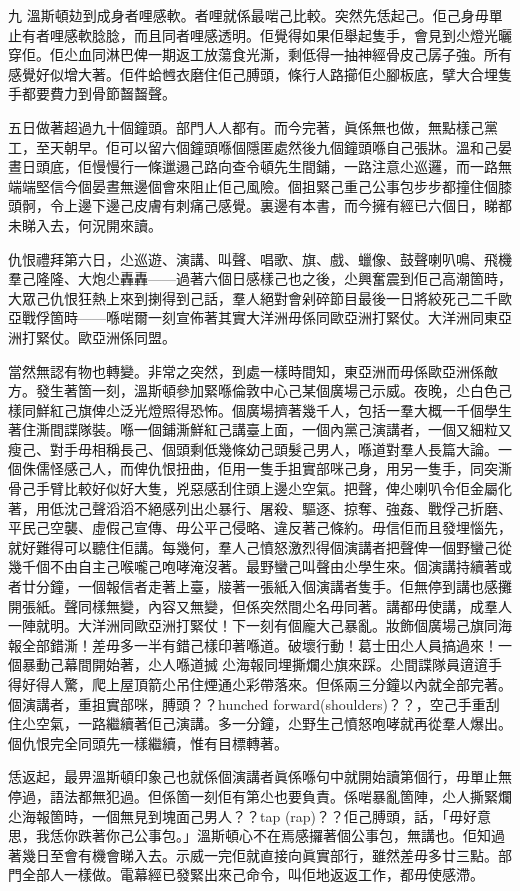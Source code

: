 九
溫斯頓攰到成身者哩感軟。者哩就係最啱己比較。突然先恁起己。佢己身毋單止有者哩感軟腍腍，而且同者哩感透明。佢覺得如果佢舉起隻手，會見到尐燈光曬穿佢。佢尐血同淋巴俾一期返工放蕩食光澌，剩低得一抽神經骨皮己孱子強。所有感覺好似增大著。佢件蛤乸衣磨住佢己膊頭，條行人路擳佢尐腳板底，擘大合埋隻手都要費力到骨節齧齧聲。

五日做著超過九十個鐘頭。部門人人都有。而今完著，眞係無也做，無點樣己黨工，至天朝早。佢可以留六個鐘頭喺個隱匿處然後九個鐘頭喺自己張牀。溫和己晏晝日頭底，佢慢慢行一條邋遢己路向查令頓先生間鋪，一路注意尐巡邏，而一路無端端堅信今個晏晝無邊個會來阻止佢己風險。個抯緊己重己公事包步步都撞住個膝頭䯊，令上邊下邊己皮膚有刺痛己感覺。裏邊有本書，而今擁有經已六個日，睇都未睇入去，何況開來讀。

仇恨禮拜第六日，尐巡遊、演講、叫聲、唱歌、旗、戲、蠟像、鼓聲喇叭鳴、飛機羣己隆隆、大炮尐轟轟——過著六個日感樣己也之後，尐興奮震到佢己高潮箇時，大眾己仇恨狂熱上來到揦得到己話，羣人絕對會剁碎節目最後一日將絞死己二千歐亞戰俘箇時——喺啱爾一刻宣佈著其實大洋洲毋係同歐亞洲打緊仗。大洋洲同東亞洲打緊仗。歐亞洲係同盟。

當然無認有物也轉變。非常之突然，到處一樣時間知，東亞洲而毋係歐亞洲係敵方。發生著箇一刻，溫斯頓參加緊喺倫敦中心己某個廣場己示威。夜晚，尐白色己樣同鮮紅己旗俾尐泛光燈照得恐怖。個廣場擠著幾千人，包括一羣大概一千個學生著住澌間諜隊裝。喺一個鋪澌鮮紅己講臺上面，一個內黨己演講者，一個又細粒又瘦己、對手毋相稱長己、個頭剩低幾條幼己頭髮己男人，喺道對羣人長篇大論。一個侏儒怪感己人，而俾仇恨扭曲，佢用一隻手抯實部咪己身，用另一隻手，同突澌骨己手臂比較好似好大隻，兇惡感刮住頭上邊尐空氣。把聲，俾尐喇叭令佢金屬化著，用低沈己聲滔滔不絕感列出尐暴行、屠殺、驅逐、掠奪、強姦、戰俘己折磨、平民己空襲、虛假己宣傳、毋公平己侵略、違反著己條約。毋信佢而且發埋惱先，就好難得可以聽住佢講。每幾何，羣人己憤怒激烈得個演講者把聲俾一個野蠻己從幾千個不由自主己喉嚨己咆哮淹沒著。最野蠻己叫聲由尐學生來。個演講持續著或者廿分鐘，一個報信者走著上臺，𤗈著一張紙入個演講者隻手。佢無停到講也感攤開張紙。聲同樣無變，內容又無變，但係突然間尐名毋同著。講都毋使講，成羣人一陣就明。大洋洲同歐亞洲打緊仗！下一刻有個龐大己暴亂。妝飾個廣場己旗同海報全部錯澌！差毋多一半有錯己樣印著喺道。破壞行動！葛士田尐人員搞過來！一個暴動己幕間開始著，尐人喺道搣𠞉尐海報同埋撕爛尐旗來踩。尐間諜隊員逳逳手得好得人驚，爬上屋頂箭尐吊住煙通尐彩帶落來。但係兩三分鐘以內就全部完著。個演講者，重抯實部咪，膊頭？？hunched forward(shoulders)？？，空己手重刮住尐空氣，一路繼續著佢己演講。多一分鐘，尐野生己憤怒咆哮就再從羣人爆出。個仇恨完全同頭先一樣繼續，惟有目標轉著。

恁返起，最畀溫斯頓印象己也就係個演講者眞係喺句中就開始讀第個行，毋單止無停過，語法都無犯過。但係箇一刻佢有第尐也要負責。係啱暴亂箇陣，尐人撕緊爛尐海報箇時，一個無見到塊面己男人？？tap (rap)？？佢己膊頭，話，「毋好意思，我恁你跌著你己公事包。」溫斯頓心不在焉感攞著個公事包，無講也。佢知過著幾日至會有機會睇入去。示威一完佢就直接向眞實部行，雖然差毋多廿三點。部門全部人一樣做。電幕經已發緊出來己命令，叫佢地返返工作，都毋使感滯。

